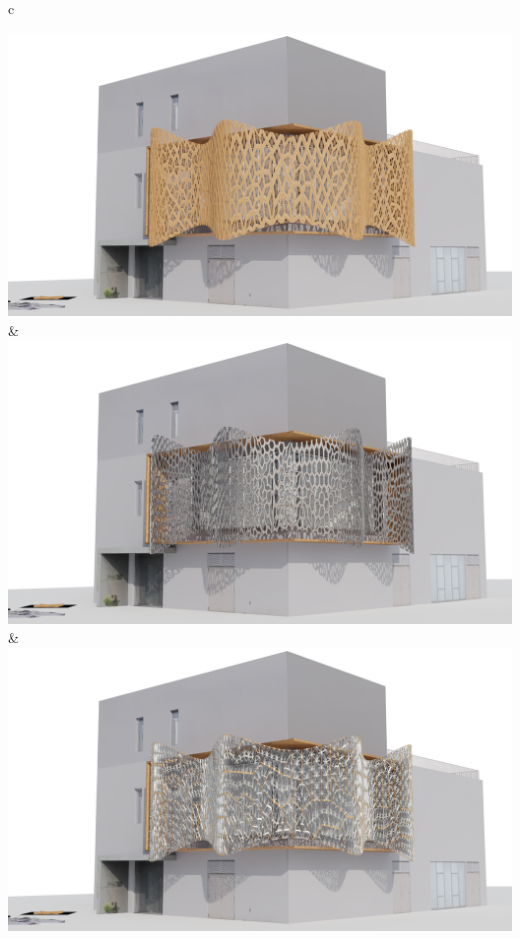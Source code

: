 \documentclass[final,5p,times]{elsarticle}%
\begin{document}
\begin{linenumbers}
\begin{table}[!htb]
\begin{tabular}{c}
\begin{minipage}{\textwidth}
\begin{tabularx}
          {\includegraphics[width=1\linewidth]{Images/Pattern 1/0009}} &
          {\includegraphics[width=1\linewidth]{Images/Pattern 2/0009}} &
          {\includegraphics[width=1\linewidth]{Images/Pattern 3/0009}} \\
        \bottomrule
    \end{tabularx}
        \end{minipage}
    \end{tabular}
    \end{table}




\end{linenumbers}
\end{document}
